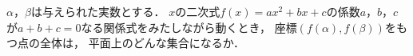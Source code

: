 \documentclass[../../main.tex]{subfiles}
\begin{document}
$\alpha$，$\beta$は与えられた実数とする．
$x$の二次式$f(x)=ax^2+bx+c$の係数$a$，$b$，$c$が$a+b+c=0$なる関係式をみたしながら動くとき，
座標$(f(\alpha),f(\beta))$をもつ点の全体は，
平面上のどんな集合になるか．
\end{document}
